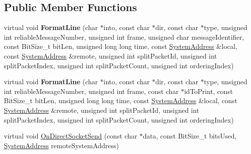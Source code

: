 \subsection*{Public Member Functions}
\begin{DoxyCompactItemize}
\item 
\hypertarget{class_rak_net_1_1_packet_logger_a30bde674a2fccc4ee502c4bc8eb86db9}{virtual void {\bfseries Format\-Line} (char $\ast$into, const char $\ast$dir, const char $\ast$type, unsigned int reliable\-Message\-Number, unsigned int frame, unsigned char message\-Identifier, const Bit\-Size\-\_\-t bit\-Len, unsigned long long time, const \hyperlink{struct_rak_net_1_1_system_address}{System\-Address} \&local, const \hyperlink{struct_rak_net_1_1_system_address}{System\-Address} \&remote, unsigned int split\-Packet\-Id, unsigned int split\-Packet\-Index, unsigned int split\-Packet\-Count, unsigned int ordering\-Index)}\label{class_rak_net_1_1_packet_logger_a30bde674a2fccc4ee502c4bc8eb86db9}

\item 
\hypertarget{class_rak_net_1_1_packet_logger_a5cb471dcdd72bafc1285e9a4c073919c}{virtual void {\bfseries Format\-Line} (char $\ast$into, const char $\ast$dir, const char $\ast$type, unsigned int reliable\-Message\-Number, unsigned int frame, const char $\ast$id\-To\-Print, const Bit\-Size\-\_\-t bit\-Len, unsigned long long time, const \hyperlink{struct_rak_net_1_1_system_address}{System\-Address} \&local, const \hyperlink{struct_rak_net_1_1_system_address}{System\-Address} \&remote, unsigned int split\-Packet\-Id, unsigned int split\-Packet\-Index, unsigned int split\-Packet\-Count, unsigned int ordering\-Index)}\label{class_rak_net_1_1_packet_logger_a5cb471dcdd72bafc1285e9a4c073919c}

\item 
\hypertarget{class_rak_net_1_1_packet_logger_a574e24adec497ee567f5ea7a1aaa2d26}{virtual void \hyperlink{class_rak_net_1_1_packet_logger_a574e24adec497ee567f5ea7a1aaa2d26}{On\-Direct\-Socket\-Send} (const char $\ast$data, const Bit\-Size\-\_\-t bits\-Used, \hyperlink{struct_rak_net_1_1_system_address}{System\-Address} remote\-System\-Address)}\label{class_rak_net_1_1_packet_logger_a574e24adec497ee567f5ea7a1aaa2d26}


\end{DoxyCompactItemize}
